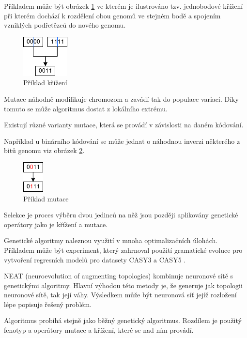 Příkladem může být obrázek \ref{fig:crossover} ve kterém je ilustrováno tzv. jednobodové křížení \cite[s.~50]{geneticCZ} při kterém dochází k rozdělení obou genomů ve stejném bodě a spojením vzniklých podřetězců do nového genomu.
	
\begin{figure}[ht]
	\centering
	\includegraphics[scale=0.95]{crossover}
	\caption{Příklad křížení}
	\label{fig:crossover}
\end{figure}

Mutace náhodně modifikuje chromozom a zavádí tak do populace variaci. Díky tomuto se může algoritmus dostat z lokálního extrému. 

Existují různé varianty mutace, která se provádí v závislosti na daném kódování. 

Například u binárního kódování se může jednat o náhodnou inverzi některého z bitů genomu viz obrázek \ref{fig:mutation}.

\begin{figure}[h!]
	\centering
	\includegraphics[scale=1.0]{mutation}
	\caption{Příklad mutace}
	\label{fig:mutation}
\end{figure}

Selekce je proces výběru dvou jedinců na něž jsou později aplikovány genetické operátory jako je křížení a mutace. 

Genetické algoritmy naleznou využití v mnoha optimalizačních úlohách. Příkladem může být experiment, který zahrnoval použití gramatické evoluce pro vytvoření regresních modelů pro datasety CASY3 a CASY5 \cite[s.~2-9]{differentialEvolution}.

NEAT (neuroevolution of augmenting topologies) kombinuje neuronové sítě s genetickými algoritmy. Hlavní výhodou této metody je, že generuje jak topologii neuronové sítě, tak její váhy. Výsledkem může být neuronová síť jejíž rozložení lépe popisuje řešený problém.

Algoritmus probíhá stejně jako běžný genetický algoritmus. Rozdílem je použitý fenotyp a operátory mutace a křížení, které se nad ním provádí.

